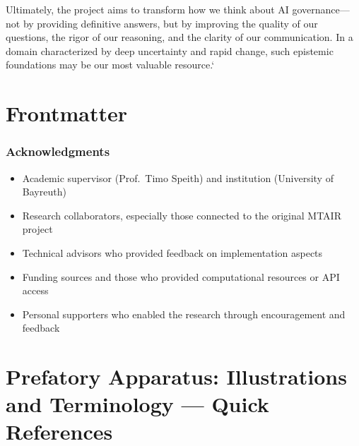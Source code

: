 \documentclass[12pt,a4paper]{report}
\providecommand{\tightlist}{%
  \setlength{\itemsep}{0pt}\setlength{\parskip}{0pt}}
\begin{document}
Ultimately, the project aims to transform how we think about AI
governance---not by providing definitive answers, but by improving the
quality of our questions, the rigor of our reasoning, and the clarity of
our communication. In a domain characterized by deep uncertainty and
rapid change, such epistemic foundations may be our most valuable
resource.`


\chapter*{Frontmatter}\label{frontmatter}


\subsection*{\texorpdfstring{\textbf{Acknowledgments}}{Acknowledgments}}\label{acknowledgments}

\begin{itemize}
\tightlist
\item
  Academic supervisor (Prof.~Timo Speith) and institution (University of
  Bayreuth)\\
\item
  Research collaborators, especially those connected to the original
  MTAIR project\\
\item
  Technical advisors who provided feedback on implementation aspects\\
\item
  Funding sources and those who provided computational resources or API
  access\\
\item
  Personal supporters who enabled the research through encouragement and
  feedback
\end{itemize}


\chapter*{Prefatory Apparatus: Illustrations and Terminology --- Quick
References}\label{prefatory-apparatus-illustrations-and-terminology-quick-references}
\end{document}
